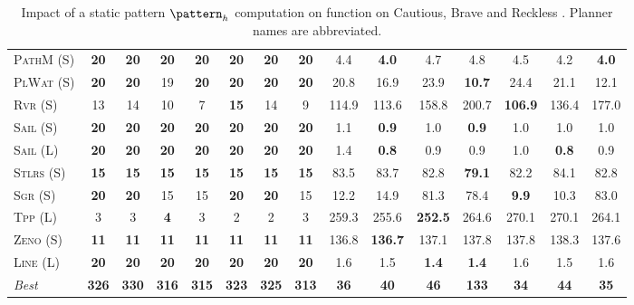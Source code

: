\begin{table}[tb]
{\begin{tabular}{|l||ccccccc||ccccccc||}
\textsc{PathM} (S)&\textbf{20}&\textbf{20}&\textbf{20}&\textbf{20}&\textbf{20}&\textbf{20}&\textbf{20}&4.4&\textbf{4.0}&4.7&4.8&4.5&4.2&\textbf{4.0}\\
\textsc{PlWat} (S)&\textbf{20}&\textbf{20}&19&\textbf{20}&\textbf{20}&\textbf{20}&\textbf{20}&20.8&16.9&23.9&\textbf{10.7}&24.4&21.1&12.1\\
\textsc{Rvr} (S)&13&14&10&7&\textbf{15}&14&9&114.9&113.6&158.8&200.7&\textbf{106.9}&136.4&177.0\\
\textsc{Sail} (S)&\textbf{20}&\textbf{20}&\textbf{20}&\textbf{20}&\textbf{20}&\textbf{20}&\textbf{20}&1.1&\textbf{0.9}&1.0&\textbf{0.9}&1.0&1.0&1.0\\
\textsc{Sail} (L)&\textbf{20}&\textbf{20}&\textbf{20}&\textbf{20}&\textbf{20}&\textbf{20}&\textbf{20}&1.4&\textbf{0.8}&0.9&0.9&1.0&\textbf{0.8}&0.9\\
\textsc{Stlrs} (S)&\textbf{15}&\textbf{15}&\textbf{15}&\textbf{15}&\textbf{15}&\textbf{15}&\textbf{15}&83.5&83.7&82.8&\textbf{79.1}&82.2&84.1&82.8\\
\textsc{Sgr} (S)&\textbf{20}&\textbf{20}&15&15&\textbf{20}&\textbf{20}&15&12.2&14.9&81.3&78.4&\textbf{9.9}&10.3&83.0\\
\textsc{Tpp} (L)&3&3&\textbf{4}&3&2&2&3&259.3&255.6&\textbf{252.5}&264.6&270.1&270.1&264.1\\
\textsc{Zeno} (S)&\textbf{11}&\textbf{11}&\textbf{11}&\textbf{11}&\textbf{11}&\textbf{11}&\textbf{11}&136.8&\textbf{136.7}&137.1&137.8&137.8&138.3&137.6\\
\textsc{Line} (L)&\textbf{20}&\textbf{20}&\textbf{20}&\textbf{20}&\textbf{20}&\textbf{20}&\textbf{20}&1.6&1.5&\textbf{1.4}&\textbf{1.4}&1.6&1.5&1.6
\\\hline
\textit{Best}&\textbf{326}&\textbf{330}&\textbf{316}&\textbf{315}&\textbf{323}&\textbf{325}&\textbf{313}&\textbf{36}&\textbf{40}&\textbf{46}&\textbf{133}&\textbf{34}&\textbf{44}&\textbf{35}\\\hline

        \end{tabular}}
        \caption{Impact of a static pattern $\pattern_h$ computation on function on Cautious, Brave and Reckless \pattyd. Planner names are abbreviated.}
        \label{tab:abl-patternh-static}
        \end{table}
        